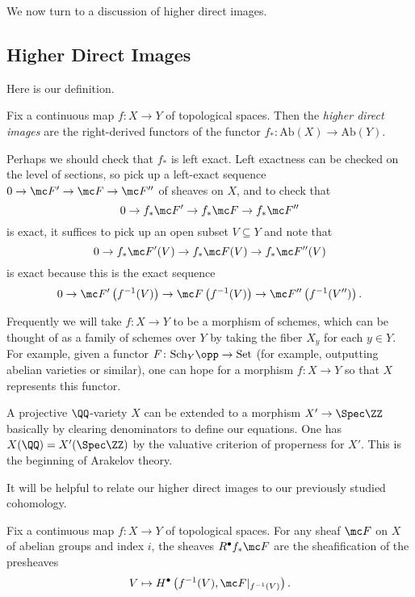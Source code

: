 \documentclass[../notes.tex]{subfiles}
\begin{document}
We now turn to a discussion of higher direct images.

\subsection{Higher Direct Images}
Here is our definition.
\begin{definition}
	Fix a continuous map $f\colon X\to Y$ of topological spaces. Then the \textit{higher direct images} are the right-derived functors of the functor $f_*\colon\mathrm{Ab}(X)\to\mathrm{Ab}(Y)$.
\end{definition}
\begin{remark}
	Perhaps we should check that $f_*$ is left exact. Left exactness can be checked on the level of sections, so pick up a left-exact sequence $0\to\mc F'\to\mc F\to\mc F''$ of sheaves on $X$, and to check that
	\[0\to f_*\mc F'\to f_*\mc F\to f_*\mc F''\]
	is exact, it suffices to pick up an open subset $V\subseteq Y$ and note that
	\[0\to f_*\mc F'(V)\to f_*\mc F(V)\to f_*\mc F''(V)\]
	is exact because this is the exact sequence
	\[0\to \mc F'\left(f^{-1}(V)\right)\to\mc F\left(f^{-1}(V)\right)\to\mc F''\left(f^{-1}(V'')\right).\]
\end{remark}
\begin{example}
	Frequently we will take $f\colon X\to Y$ to be a morphism of schemes, which can be thought of as a family of schemes over $Y$ by taking the fiber $X_y$ for each $y\in Y$. For example, given a functor $F\colon\mathrm{Sch}_Y\opp\to\mathrm{Set}$ (for example, outputting abelian varieties or similar), one can hope for a morphism $f\colon X\to Y$ so that $X$ represents this functor.
\end{example}
\begin{example}
	A projective $\QQ$-variety $X$ can be extended to a morphism $X'\to\Spec\ZZ$ basically by clearing denominators to define our equations. One has $X(\QQ)=X'(\Spec\ZZ)$ by the valuative criterion of properness for $X'$. This is the beginning of Arakelov theory.
\end{example}
It will be helpful to relate our higher direct images to our previously studied cohomology.
\begin{proposition} \label{prop:higher-direct-image-as-sheafification}
	Fix a continuous map $f\colon X\to Y$ of topological spaces. For any sheaf $\mc F$ on $X$ of abelian groups and index $i$, the sheaves $R^\bullet f_*\mc F$ are the sheafification of the presheaves
	\[V\mapsto H^\bullet\left(f^{-1}(V),\mc F|_{f^{-1}(V)}\right).\]
\end{proposition}
\end{document}
